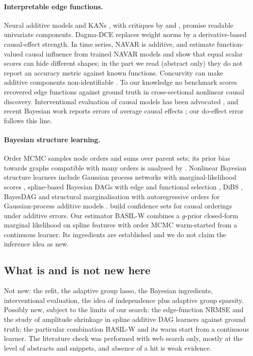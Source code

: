 \documentclass[11pt,a4paper]{article}
\begin{document}
\paragraph{Interpretable edge functions.} Neural additive models \citep{agarwal2021} and KANs \citep{liu2025kan}, with critiques by \citet{yu2024kan} and \citet{hou2024kan}, promise readable univariate components. Dagma-DCE \citep{waxman2024} replaces weight norms by a derivative-based causal-effect strength. In time series, NAVAR \citep{bussmann2021} is additive, and \citet{kuskova2026} estimate function-valued causal influence from trained NAVAR models and show that equal scalar scores can hide different shapes; in the part we read (abstract only) they do not report an accuracy metric against known functions. Concurvity can make additive components non-identifiable \citep{siems2023}. To our knowledge no benchmark scores recovered edge functions against ground truth in cross-sectional nonlinear causal discovery. Interventional evaluation of causal models has been advocated \citep{gentzel2019}, and recent Bayesian work reports errors of average causal effects \citep{toth2025}; our do-effect error follows this line.

\paragraph{Bayesian structure learning.} Order MCMC \citep{friedman2003} samples node orders and sums over parent sets; its prior bias towards graphs compatible with many orders is analysed by \citet{viinikka2020}. Nonlinear Bayesian structure learners include Gaussian process networks with marginal-likelihood scores \citep{friedman2000}, spline-based Bayesian DAGs with edge and functional selection \citep{ni2015}, DiBS \citep{lorch2021}, BayesDAG \citep{annadani2023} and structural marginalisation with autoregressive orders for Gaussian-process additive models \citep{toth2025}. \citet{wang2025orderings} build confidence sets for causal orderings under additive errors. Our estimator BASIL-W combines a $g$-prior closed-form marginal likelihood on spline features with order MCMC warm-started from a continuous learner. Its ingredients are established and we do not claim the inference idea as new.

\subsection{What is and is not new here}
\label{sec:novelty}
Not new: the refit, the adaptive group lasso, the Bayesian ingredients, interventional evaluation, the idea of independence plus adaptive group sparsity. Possibly new, subject to the limits of our search: the edge-function NRMSE and the study of amplitude shrinkage in spline additive DAG learners against ground truth; the particular combination BASIL-W and its warm start from a continuous learner. The literature check was performed with web search only, mostly at the level of abstracts and snippets, and absence of a hit is weak evidence.
\end{document}
